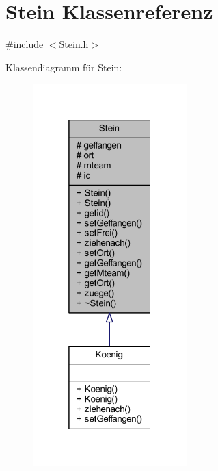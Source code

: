 \hypertarget{class_stein}{}\section{Stein Klassenreferenz}
\label{class_stein}


{\ttfamily \#include $<$Stein.\+h$>$}



Klassendiagramm für Stein\+:\nopagebreak
\begin{figure}[H]
\begin{center}
\leavevmode
\includegraphics[width=169pt]{class_stein__inherit__graph}
\end{center}
\end{figure}


